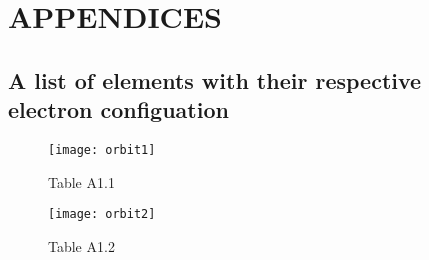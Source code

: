 \documentclass[a4paper,11pt]{article}
\begin{document}
\newpage
{}
\section*{\center APPENDICES}
\label{sec:APPENDICES}
\subsection*{A list of elements with their respective electron configuation}
\begin{figure}[htbp]
  \centering
  \texttt{[image: orbit1]}
  \caption{Table A1.1}
  \label{1}
  \end{figure}
\begin{figure}[htbp]
  \centering
  \texttt{[image: orbit2]}
  \caption{Table A1.2}
  \label{2}
  \end{figure}
  
\newpage
\end{document}
